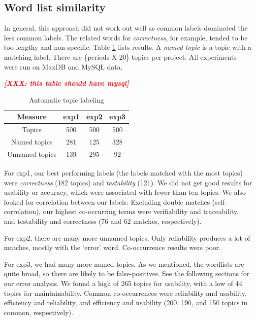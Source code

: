 \documentclass{acm_proc_article-sp}
\newcommand{\XXX}[1]{\textcolor{red}{{\it \textbf{[XXX: #1]}}}}
\begin{document}
\subsection{Word list similarity}


In general, this approach did not work out well as common labels dominated the less common labels. The related words for \emph{correctness}, for example, tended to be too lengthy and non-specific. Table \ref{tbl:wordlist} lists results. A \emph{named   topic} is a topic with a matching label. There are \{periods X 20\} topics per project. All experiments were run on MaxDB and MySQL data.



\XXX{this table should have mysql}
\begin{table}
	\caption{Automatic topic labeling}
	\centering
	\label{tbl:wordlist}
\begin{tabular}{c|c|c|c}
\toprule
Measure &		 \textsf{exp1} &	 \textsf{exp2} &	 \textsf{exp3} \\
\midrule
Topics &			500		 &			500  	 & 		500  \\
Named topics &		281      &			125      &		328  \\
Unnamed topics &	139      &			295      &      92   \\
\bottomrule
\end{tabular}
\end{table}


For \textsf{exp1}, our best performing labels (the labels matched with the most topics) were \emph{correctness} (182 topics) and \emph{testability} (121). We did not get good results for usability or accuracy, which were associated with fewer than ten topics. We also looked for correlation between our labels: Excluding double matches (self-correlation), our highest co-occurring terms were verifiability and traceability, and testability and correctness (76 and 62 matches, respectively).

For \textsf{exp2}, there are many more unnamed topics. Only reliability produces a lot of matches, mostly with the `error' word. Co-occurrence results were poor.

For \textsf{exp3}, we had many more named topics. As we mentioned, the wordlists are quite broad, so there are likely to be false-positives. See the following sections for our error analysis. We found a high of 265 topics for usability, with a low of 44 topics for maintainability. Common co-occurrences were reliability and usability, efficiency and reliability, and efficiency and usability (200, 190, and 150 topics in common, respectively). 
\end{document}
